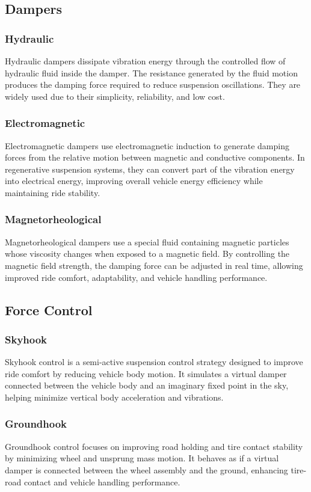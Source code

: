 \subsection{Dampers}
\subsubsection{Hydraulic}
Hydraulic dampers dissipate vibration energy through the controlled flow of hydraulic fluid inside the damper. The resistance generated by the fluid motion produces the damping force required to reduce suspension oscillations. They are widely used due to their simplicity, reliability, and low cost.
\subsubsection{Electromagnetic}
Electromagnetic dampers use electromagnetic induction to generate damping forces from the relative motion between magnetic and conductive components. In regenerative suspension systems, they can convert part of the vibration energy into electrical energy, improving overall vehicle energy efficiency while maintaining ride stability.
\subsubsection{Magnetorheological}
Magnetorheological dampers use a special fluid containing magnetic particles whose viscosity changes when exposed to a magnetic field. By controlling the magnetic field strength, the damping force can be adjusted in real time, allowing improved ride comfort, adaptability, and vehicle handling performance.

\subsection{Force Control}
\subsubsection{Skyhook}
Skyhook control is a semi-active suspension control strategy designed to improve ride comfort by reducing vehicle body motion. It simulates a virtual damper connected between the vehicle body and an imaginary fixed point in the sky, helping minimize vertical body acceleration and vibrations.
\subsubsection{Groundhook}
Groundhook control focuses on improving road holding and tire contact stability by minimizing wheel and unsprung mass motion. It behaves as if a virtual damper is connected between the wheel assembly and the ground, enhancing tire-road contact and vehicle handling performance.
